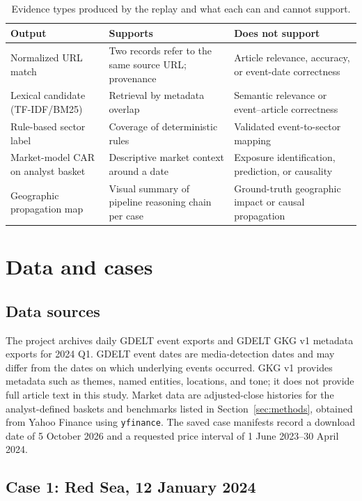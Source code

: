 \documentclass[10pt,a4paper,twocolumn]{article}
\begin{document}
\begin{table}[t]
\centering
\caption{Evidence types produced by the replay and what each can and cannot support.}
\label{tab:evidence}
\small
\begin{tabular}{p{3.0cm}p{6.0cm}p{7.2cm}}
\toprule
\textbf{Output} & \textbf{Supports} & \textbf{Does not support} \\
\midrule
Normalized URL match & Two records refer to the same source URL; provenance & Article relevance, accuracy, or event-date correctness \\
Lexical candidate (TF-IDF/BM25) & Retrieval by metadata overlap & Semantic relevance or event--article correctness \\
Rule-based sector label & Coverage of deterministic rules & Validated event-to-sector mapping \\
Market-model CAR on analyst basket & Descriptive market context around a date & Exposure identification, prediction, or causality \\
Geographic propagation map & Visual summary of pipeline reasoning chain per case & Ground-truth geographic impact or causal propagation \\
\bottomrule
\end{tabular}
\end{table}

\section{Data and cases}\label{sec:data}

\subsection{Data sources}

The project archives daily GDELT event exports and GDELT GKG v1 metadata exports for 2024 Q1. GDELT event dates are media-detection dates and may differ from the dates on which underlying events occurred. GKG v1 provides metadata such as themes, named entities, locations, and tone; it does not provide full article text in this study. Market data are adjusted-close histories for the analyst-defined baskets and benchmarks listed in Section~\ref{sec:methods}, obtained from Yahoo Finance using \texttt{yfinance}. The saved case manifests record a download date of 5 October 2026 and a requested price interval of 1 June 2023--30 April 2024.

\subsection{Case 1: Red Sea, 12 January 2024}
\end{document}
